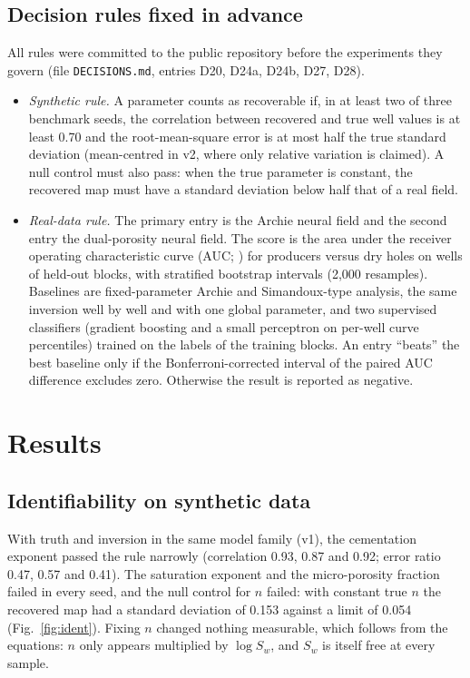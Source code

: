 \documentclass[preprint,12pt]{elsarticle}
\begin{document}
\subsection{Decision rules fixed in advance}
All rules were committed to the public repository before the experiments they govern
(file \texttt{DECISIONS.md}, entries D20, D24a, D24b, D27, D28).
\begin{itemize}
\item \emph{Synthetic rule.} A parameter counts as recoverable if, in at least two of three
benchmark seeds, the correlation between recovered and true well values is at least 0.70 and
the root-mean-square error is at most half the true standard deviation (mean-centred in v2,
where only relative variation is claimed). A null control must also pass: when the true
parameter is constant, the recovered map must have a standard deviation below half that of a
real field.
\item \emph{Real-data rule.} The primary entry is the Archie neural field and the second entry
the dual-porosity neural field. The score is the area under the receiver operating
characteristic curve (AUC; \citealp{hanley1982auc}) for producers versus dry holes on wells of
held-out blocks, with stratified bootstrap intervals (2,000 resamples). Baselines are
fixed-parameter Archie and Simandoux-type analysis, the same inversion well by well and with
one global parameter, and two supervised classifiers (gradient boosting and a small
perceptron on per-well curve percentiles) trained on the labels of the training blocks. An
entry ``beats'' the best baseline only if the Bonferroni-corrected interval of the paired AUC
difference excludes zero. Otherwise the result is reported as negative.
\end{itemize}

\section{Results}

\subsection{Identifiability on synthetic data}
With truth and inversion in the same model family (v1), the cementation exponent passed the
rule narrowly (correlation 0.93, 0.87 and 0.92; error ratio 0.47, 0.57 and 0.41). The
saturation exponent and the micro-porosity fraction failed in every seed, and the null control
for $n$ failed: with constant true $n$ the recovered map had a standard deviation of 0.153
against a limit of 0.054 (Fig.~\ref{fig:ident}). Fixing $n$ changed nothing measurable, which
follows from the equations: $n$ only appears multiplied by $\log S_w$, and $S_w$ is itself free
at every sample.
\end{document}
